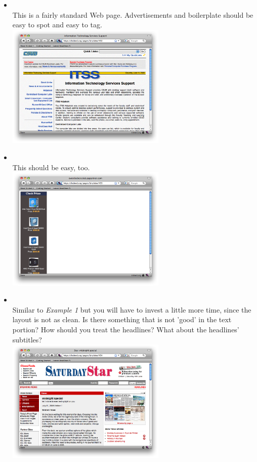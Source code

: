 \documentclass[12pt]{article}
\begin{document}
\begin{itemize}
\item {} \\
This is a fairly standard Web page. Advertisements and boilerplate should be easy to spot and easy to tag.\\
\includegraphics[width=0.6\textwidth]{images/432.png} \\

\item {} \\
This should be easy, too. \\
\includegraphics[width=0.6\textwidth]{images/433.png} \\

\item {} \\
Similar to \emph{Example 1} but you will have to invest a little more time, since the layout is not as clean. Is there something that is not 'good' in the text portion? How should you treat the headlines? What about the headlines' subtitles? \\
\includegraphics[width=0.6\textwidth]{images/434.png} \\


\end{itemize}
\end{document}
